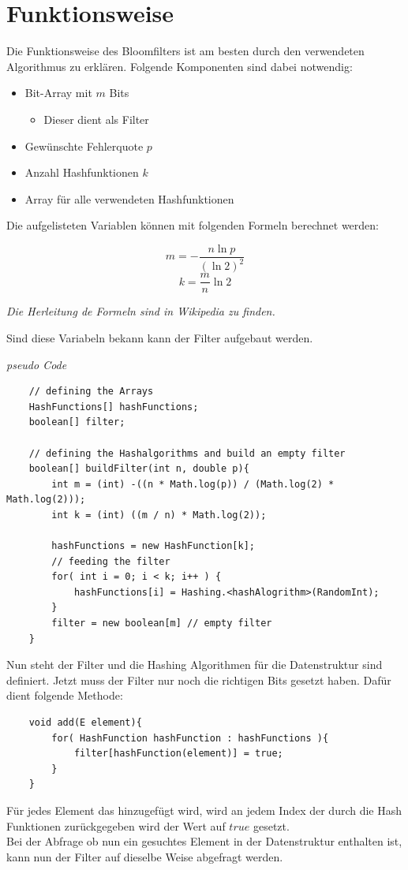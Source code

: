 \documentclass{article}
\begin{document}
\section{Funktionsweise}
Die Funktionsweise des Bloomfilters ist am besten durch den verwendeten Algorithmus zu erklären. Folgende Komponenten sind dabei notwendig:

\begin{itemize}
    \item Bit-Array mit $m$ Bits
        \begin{itemize}
            \item{Dieser dient als Filter}
        \end{itemize}
    \item Gewünschte Fehlerquote $p$
    \item Anzahl Hashfunktionen $k$
    \item Array für alle verwendeten Hashfunktionen
\end{itemize}

Die aufgelisteten Variablen können mit folgenden Formeln berechnet werden:

\begin{equation}
    m = -\frac{n \ln{p}}{(\ln{2})^2}
\end{equation}
\begin{equation}
    k = \frac{m}{n} \ln{2}
\end{equation}
\begin{center}
    \textit{Die Herleitung de Formeln sind in Wikipedia zu finden.}
\end{center}
Sind diese Variabeln bekann kann der Filter aufgebaut werden.
\begin{center}
    \textit{pseudo Code}
\end{center}
\begin{lstlisting}
    // defining the Arrays
    HashFunctions[] hashFunctions;
    boolean[] filter;

    // defining the Hashalgorithms and build an empty filter
    boolean[] buildFilter(int n, double p){
        int m = (int) -((n * Math.log(p)) / (Math.log(2) * Math.log(2)));
        int k = (int) ((m / n) * Math.log(2));

        hashFunctions = new HashFunction[k];
        // feeding the filter
        for( int i = 0; i < k; i++ ) {
            hashFunctions[i] = Hashing.<hashAlogrithm>(RandomInt);
        }
        filter = new boolean[m] // empty filter
    }
\end{lstlisting}
Nun steht der Filter und die Hashing Algorithmen für die Datenstruktur sind definiert. Jetzt muss der Filter nur noch die richtigen Bits gesetzt haben. Dafür dient folgende Methode:
\begin{lstlisting}
    void add(E element){
        for( HashFunction hashFunction : hashFunctions ){
            filter[hashFunction(element)] = true;
        }
    }
\end{lstlisting}
Für jedes Element das hinzugefügt wird, wird an jedem Index der durch die Hash Funktionen zurückgegeben wird der Wert auf $true$ gesetzt. \\
Bei der Abfrage ob nun ein gesuchtes Element in der Datenstruktur enthalten ist, kann nun der Filter auf dieselbe Weise abgefragt werden.
\end{document}
